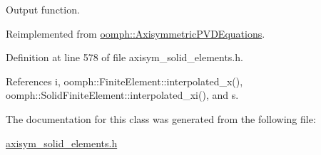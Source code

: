 Output function. 



Reimplemented from \hyperlink{classoomph_1_1AxisymmetricPVDEquations_a780e6e426869eec81758bf7396a54bad}{oomph\+::\+Axisymmetric\+P\+V\+D\+Equations}.



Definition at line 578 of file axisym\+\_\+solid\+\_\+elements.\+h.



References i, oomph\+::\+Finite\+Element\+::interpolated\+\_\+x(), oomph\+::\+Solid\+Finite\+Element\+::interpolated\+\_\+xi(), and s.



The documentation for this class was generated from the following file\+:\begin{DoxyCompactItemize}
\item 
\hyperlink{axisym__solid__elements_8h}{axisym\+\_\+solid\+\_\+elements.\+h}\end{DoxyCompactItemize}
